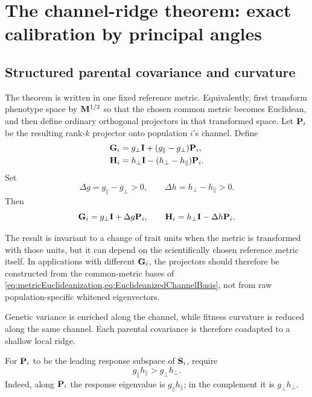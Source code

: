 \chapter{The channel-ridge theorem: exact calibration by principal angles}

\section{Structured parental covariance and curvature}

The theorem is written in one fixed reference metric. Equivalently, first transform phenotype space by \(\mathbf{M}^{1/2}\) so that the chosen common metric becomes Euclidean, and then define ordinary orthogonal projectors in that transformed space. Let \(\mathbf{P}_i\) be the resulting rank-\(k\) projector onto population \(i\)'s channel. Define
\begin{align}
\mathbf{G}_i
&=g_{\perp}\mathbf{I}+(g_{\parallel}-g_{\perp})\mathbf{P}_i,
\label{eq:ridgeG}\\
\mathbf{H}_i
&=h_{\perp}\mathbf{I}-(h_{\perp}-h_{\parallel})\mathbf{P}_i.
\label{eq:ridgeH}
\end{align}
Set
\begin{equation}
\Delta g=g_{\parallel}-g_{\perp}>0,
\qquad
\Delta h=h_{\perp}-h_{\parallel}>0.
\end{equation}
Then
\begin{equation}
\mathbf{G}_i=g_{\perp}\mathbf{I}+\Delta g\mathbf{P}_i,
\qquad
\mathbf{H}_i=h_{\perp}\mathbf{I}-\Delta h\mathbf{P}_i.
\end{equation}

\begin{cautionbox}
The result is invariant to a change of trait units when the metric is transformed with those units, but it can depend on the scientifically chosen reference metric itself. In applications with different \(\mathbf{G}_i\), the projectors should therefore be constructed from the common-metric bases of \cref{eq:metricEuclideanization,eq:EuclideanizedChannelBasis}, not from raw population-specific whitened eigenvectors.
\end{cautionbox}

\inwords Genetic variance is enriched along the channel, while fitness curvature is reduced along the same channel. Each parental covariance is therefore coadapted to a shallow local ridge.

For \(\mathbf{P}_i\) to be the leading response subspace of \(\mathbf{S}_i\), require
\begin{equation}
g_{\parallel}h_{\parallel}>g_{\perp}h_{\perp}.
\label{eq:ridgeLeadingCondition}
\end{equation}
Indeed, along \(\mathbf{P}_i\) the response eigenvalue is \(g_{\parallel}h_{\parallel}\); in the complement it is \(g_{\perp}h_{\perp}\).

